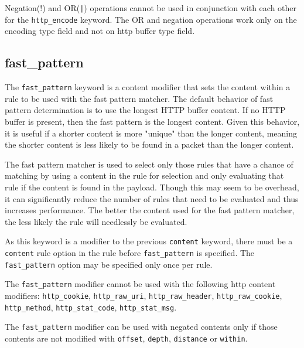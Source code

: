 \documentclass[english]{report}
\newenvironment{note}{
\samepage
    \vspace{10pt}{\textsf{
        {\hspace{7pt}\Huge{$\triangle$\hspace{-12.5pt}{\Large{$^!$}}}}\hspace{5pt}
        {\Large{NOTE}}
    }
    }
   \begin{center}
    \par\vspace{-17pt}

    \begin{lrbox}{\savepar}
    \begin{minipage}[r]{6in}
}
{
    \end{minipage}
    \end{lrbox}
    \fbox{
        \usebox{
            \savepar
	}
    }
    \par\vskip10pt
    \end{center}
}
\newenvironment{note}{
        \begin{rawhtml}
        <p><table border="1"><tr><td><b>
        Note:&nbsp;&nbsp;</b>
        \end{rawhtml}
}{
        \begin{rawhtml}
        </b></td></tr></table></p>
        \end{rawhtml}
}
\begin{document}
\begin{note}

Negation(!) and OR({\tt |}) operations cannot be used in conjunction with each other for the 
\texttt{http\_encode} keyword. The OR and negation operations work only on the encoding type
field and not on http buffer type field.

\end{note}

\subsection{fast\_pattern}
\label{sub:FastPattern}

The \texttt{fast\_pattern} keyword is a content modifier that sets the content
within a rule to be used with the fast pattern matcher. The default behavior of
fast pattern determination is to use the longest HTTP buffer content. If no HTTP
buffer is present, then the fast pattern is the longest content. Given this behavior,
it is useful if a shorter content is more "unique" than the longer content, 
meaning the shorter content is less likely to be found in a packet than the longer content.

The fast pattern matcher is used to select only those rules that have a
chance of matching by using a content in the rule for selection and only
evaluating that rule if the content is found in the payload.  Though this
may seem to be overhead, it can significantly reduce the number of rules
that need to be evaluated and thus increases performance.  The better the
content used for the fast pattern matcher, the less likely the rule will
needlessly be evaluated.

As this keyword is a modifier to the previous \texttt{content} keyword, there must be
a \texttt{content} rule option in the rule before \texttt{fast\_pattern} is specified.
The \texttt{fast\_pattern} option may be specified only once per rule.

\begin{note}
The \texttt{fast\_pattern} modifier cannot be used with the following http
content modifiers: \texttt{http\_cookie}, \texttt{http\_raw\_uri},
\texttt{http\_raw\_header}, \texttt{http\_raw\_cookie}, \texttt{http\_method},
\texttt{http\_stat\_code}, \texttt{http\_stat\_msg}.
\end{note}

\begin{note}
The \texttt{fast\_pattern} modifier can be used with negated contents only if
those contents are not modified with \texttt{offset}, \texttt{depth},
\texttt{distance} or \texttt{within}.
\end{note}
\end{document}
